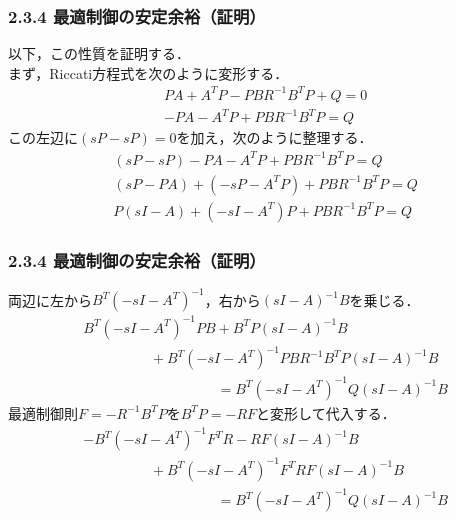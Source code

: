 \begin{frame}[t]
\frametitle{2.3.4 最適制御の安定余裕（証明）}
以下，この性質を証明する．
\\[3mm]

まず，Riccati方程式を次のように変形する．
\begin{align}
	&
	P A + A^T P - P B R^{-1} B^T P + Q = 0
\nonumber \\
	&
	- P A -  A^T P + P B R^{-1} B^T P = Q 
\nonumber
\end{align}
この左辺に$(sP - sP)=0$を加え，次のように整理する．
\begin{align}
	&
	(sP - sP) - P A -  A^T P + P B R^{-1} B^T P = Q 
\nonumber \\
	&
	(sP - P A) + (-sP-  A^T P) + P B R^{-1} B^T P = Q 
\nonumber \\
	&
	P(sI - A) + (-sI - A^T) P + P B R^{-1} B^T P = Q  
\nonumber
\end{align}
\end{frame}

\begin{frame}[t]
\frametitle{2.3.4 最適制御の安定余裕（証明）}
両辺に左から$B^T (-sI - A^T)^{-1}$，右から$(sI - A)^{-1} B$を乗じる．
\begin{align}
	&
	B^T (-sI - A^T)^{-1} P B + B^T P (sI - A)^{-1} B 
\nonumber \\
	&\hspace{2cm}
	+ B^T (-sI - A^T)^{-1}P B R^{-1} B^T P(sI - A)^{-1} B
\nonumber \\
	&\hspace{4cm}
		= B^T (-sI - A^T)^{-1}Q (sI - A)^{-1} B
\nonumber
\end{align}
最適制御則$F=-R^{-1} B^T P$を$B^T P = -R F$と変形して代入する．
\begin{align}
	&
	- B^T (-sI - A^T)^{-1} F^T R - R F (sI - A)^{-1} B 
\nonumber \\
	&\hspace{2cm}
	+ B^T (-sI - A^T)^{-1}F^T R F(sI - A)^{-1} B
\nonumber \\
	&\hspace{4cm}
		= B^T (-sI - A^T)^{-1}Q (sI - A)^{-1} B
\nonumber
\end{align}
\end{frame}

